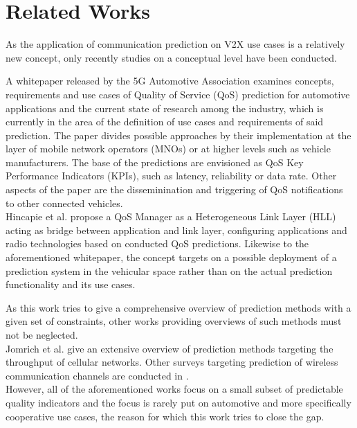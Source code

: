 \documentclass[conference]{IEEEtran}
\begin{document}
\section{Related Works}\label{sec:rw}
As the application of communication prediction on V2X use cases is a relatively new concept, only recently studies on a conceptual level have been conducted. 

A whitepaper released by the 5G Automotive Association \cite{Making5GProactive2019} examines concepts, requirements and use cases of Quality of Service (QoS) prediction for automotive applications and the current state of research among the industry, which is currently in the area of the definition of use cases and requirements of said prediction. The paper divides possible approaches by their implementation at the layer of mobile network operators (MNOs) or at higher levels such as vehicle manufacturers. The base of the predictions are envisioned as QoS Key Performance Indicators (KPIs), such as latency, reliability or data rate. Other aspects of the paper are the disseminination and triggering of QoS notifications to other connected vehicles.\\
Hincapie et al. \cite{hincapieCollaborativeDistributedQoS2020} propose a QoS Manager as a Heterogeneous Link Layer (HLL) acting as bridge between application and link layer, configuring applications and radio technologies based on conducted QoS predictions. Likewise to the aforementioned whitepaper, the concept targets on a possible deployment of a prediction system in the vehicular space rather than on the actual prediction functionality and its use cases.

As this work tries to give a comprehensive overview of prediction methods with a given set of constraints, other works providing overviews of such methods must not be neglected.\\
Jomrich et al. \cite{jomrichEnhancedCellularBandwidth2019} give an extensive overview of prediction methods targeting the throughput of cellular networks. Other surveys targeting prediction of wireless communication channels are conducted in \cite{semmelrodtInvestigationDifferentFading2003,duel-hallenFadingChannelPrediction2007,konstantinovFadingChannelPrediction2019}.\\
However, all of the aforementioned works focus on a small subset of predictable quality indicators and the focus is rarely put on automotive and more specifically cooperative use cases, the reason for which this work tries to close the gap.
\end{document}
